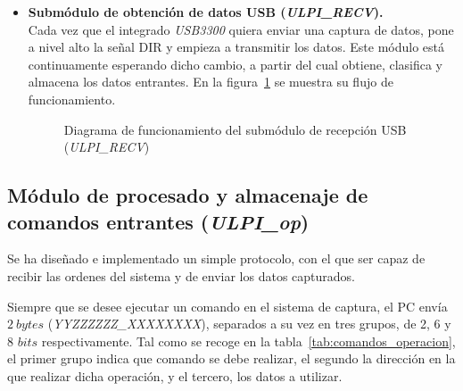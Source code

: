 \begin{itemize}
    \item \textbf{Submódulo de obtención de datos USB (\emph{ULPI\_RECV}).} \\
    Cada vez que el integrado \emph{USB3300} quiera enviar una captura de datos, pone a nivel alto la señal DIR y empieza a transmitir los datos. Este módulo está continuamente esperando dicho cambio, a partir del cual obtiene, clasifica y almacena los datos entrantes. En la figura~\ref{fig:flujo_ulpi_recv} se muestra su flujo de funcionamiento.
    \begin{figure}[hbtp]
        \centering
        \scalebox{0.8} {}
        \caption{Diagrama de funcionamiento del submódulo de recepción USB (\emph{ULPI\_RECV})}
        \label{fig:flujo_ulpi_recv}
    \end{figure}
\end{itemize}


\subsection{Módulo de procesado y almacenaje de comandos entrantes (\emph{ULPI\_op})}
Se ha diseñado e implementado un simple protocolo, con el que ser capaz de recibir las ordenes del sistema y de enviar los datos capturados.

Siempre que se desee ejecutar un comando en el sistema de captura, el PC envía $2~bytes$ (\emph{YYZZZZZZ\_XXXXXXXX}), separados a su vez en tres grupos, de 2, 6 y 8 $bits$ respectivamente. Tal como se recoge en la tabla~\ref{tab:comandos_operacion}, el primer grupo indica que comando se debe realizar, el segundo la dirección en la que realizar dicha operación, y el tercero, los datos a utilizar.


